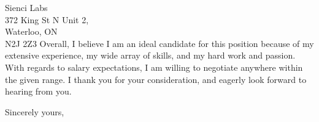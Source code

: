 \documentclass[11pt]{letter} %
\begin{document}
\begin{letter}{Sienci Labs \\
 372 King St N Unit 2,\\
 Waterloo, ON \\
 N2J 2Z3}
Overall, I believe I am an ideal candidate for this position because of my extensive experience, my wide array of skills, and my hard work and passion. With regards to salary expectations, I am willing to negotiate anywhere within the given range. I thank you for your consideration, and eagerly look forward to hearing from you.

\closing{Sincerely yours,}


\end{letter}
\end{document}
